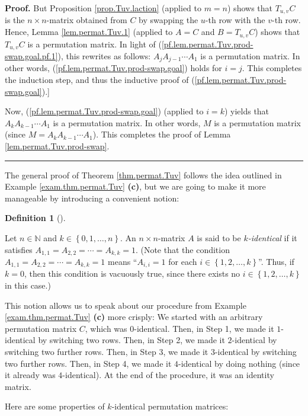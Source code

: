 \documentclass[numbers=enddot,12pt,final,onecolumn,notitlepage]{scrartcl}%
\theoremstyle{definition}
\newtheorem{defi}[theo]{Definition}
\newenvironment{definition}[1][]
{\begin{defi}[#1]\begin{leftbar}}
{\end{leftbar}\end{defi}}
\newenvironment{proof}[1][Proof]{\noindent\textbf{#1.} }{\ \rule{0.5em}{0.5em}}
\begin{document}
\begin{proof}
But Proposition \ref{prop.Tuv.laction} (applied to $m=n$) shows that
$T_{u,v}C$ is the $n\times n$-matrix obtained from $C$ by swapping the $u$-th
row with the $v$-th row. Hence, Lemma \ref{lem.permat.Tuv.1} (applied to $A=C$
and $B=T_{u,v}C$) shows that $T_{u,v}C$ is a permutation matrix. In light of
(\ref{pf.lem.permat.Tuv.prod-swap.goal.pf.1}), this rewrites as follows:
$A_{j}A_{j-1}\cdots A_{1}$ is a permutation matrix. In other words,
(\ref{pf.lem.permat.Tuv.prod-swap.goal}) holds for $i=j$. This completes the
induction step, and thus the inductive proof of
(\ref{pf.lem.permat.Tuv.prod-swap.goal}).]

Now, (\ref{pf.lem.permat.Tuv.prod-swap.goal}) (applied to $i=k$) yields that
$A_{k}A_{k-1}\cdots A_{1}$ is a permutation matrix. In other words, $M$ is a
permutation matrix (since $M=A_{k}A_{k-1}\cdots A_{1}$). This completes the
proof of Lemma \ref{lem.permat.Tuv.prod-swap}.
\end{proof}

The general proof of Theorem \ref{thm.permat.Tuv} follows the idea outlined in
Example \ref{exam.thm.permat.Tuv} \textbf{(c)}, but we are going to make it
more manageable by introducing a convenient notion:

\begin{definition}
\label{def.thm.permat.Tuv.k-id}Let $n\in\mathbb{N}$ and $k\in\left\{
0,1,\ldots,n\right\}  $. An $n\times n$-matrix $A$ is said to be
$k$\textit{-identical} if it satisfies $A_{1,1}=A_{2,2}=\cdots=A_{k,k}=1$.
(Note that the condition $A_{1,1}=A_{2,2}=\cdots=A_{k,k}=1$ means
\textquotedblleft$A_{i,i}=1$ for each $i\in\left\{  1,2,\ldots,k\right\}
$\textquotedblright. Thus, if $k=0$, then this condition is vacuously true,
since there exists no $i\in\left\{  1,2,\ldots,k\right\}  $ in this case.)
\end{definition}

This notion allows us to speak about our procedure from Example
\ref{exam.thm.permat.Tuv} \textbf{(c)} more crisply: We started with an
arbitrary permutation matrix $C$, which was $0$-identical. Then, in Step 1, we
made it $1$-identical by switching two rows. Then, in Step 2, we made it
$2$-identical by switching two further rows. Then, in Step 3, we made it
$3$-identical by switching two further rows. Then, in Step 4, we made it
$4$-identical by doing nothing (since it already was $4$-identical). At the
end of the procedure, it was an identity matrix.

Here are some properties of $k$-identical permutation matrices:
\end{document}
